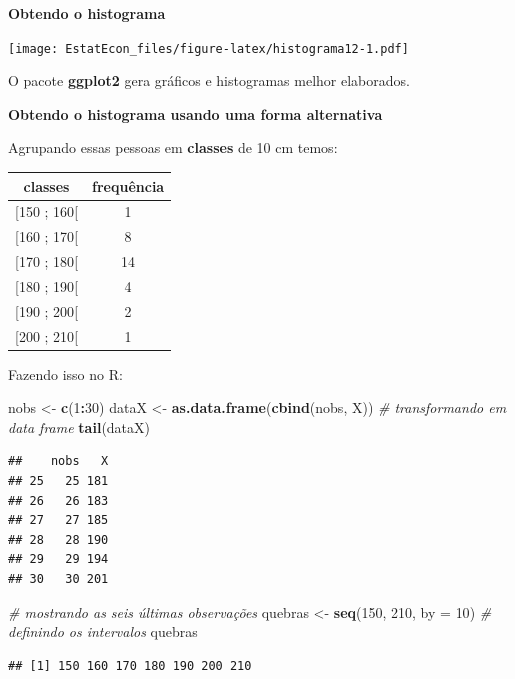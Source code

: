 \documentclass[
]{book}
\newenvironment{Shaded}{\begin{snugshade}}{\end{snugshade}}
\newcommand{\CommentTok}[1]{\textcolor[rgb]{0.56,0.35,0.01}{\textit{#1}}}
\newcommand{\DataTypeTok}[1]{\textcolor[rgb]{0.13,0.29,0.53}{#1}}
\newcommand{\DecValTok}[1]{\textcolor[rgb]{0.00,0.00,0.81}{#1}}
\newcommand{\KeywordTok}[1]{\textcolor[rgb]{0.13,0.29,0.53}{\textbf{#1}}}
\newcommand{\NormalTok}[1]{#1}
\newcommand{\OperatorTok}[1]{\textcolor[rgb]{0.81,0.36,0.00}{\textbf{#1}}}
\newcommand{\OtherTok}[1]{\textcolor[rgb]{0.56,0.35,0.01}{#1}}
\newcommand{\StringTok}[1]{\textcolor[rgb]{0.31,0.60,0.02}{#1}}
\begin{document}
\textbf{Obtendo o histograma}

\texttt{[image: EstatEcon\_files/figure-latex/histograma12-1.pdf]}

O pacote \textbf{ggplot2} gera gráficos e histogramas melhor elaborados.

\textbf{Obtendo o histograma usando uma forma alternativa}

Agrupando essas pessoas em \textbf{classes} de 10 cm temos:

\begin{longtable}[]{@{}cc@{}}
\toprule
classes & frequência\tabularnewline
\midrule
\endhead
{[}150 ; 160{[} & 1\tabularnewline
{[}160 ; 170{[} & 8\tabularnewline
{[}170 ; 180{[} & 14\tabularnewline
{[}180 ; 190{[} & 4\tabularnewline
{[}190 ; 200{[} & 2\tabularnewline
{[}200 ; 210{[} & 1\tabularnewline
\bottomrule
\end{longtable}

Fazendo isso no R:

\begin{Shaded}
\begin{Highlighting}[]
\NormalTok{nobs <-}\StringTok{ }\KeywordTok{c}\NormalTok{(}\DecValTok{1}\OperatorTok{:}\DecValTok{30}\NormalTok{)}
\NormalTok{dataX <-}\StringTok{ }\KeywordTok{as.data.frame}\NormalTok{(}\KeywordTok{cbind}\NormalTok{(nobs, X))}
\CommentTok{# transformando em data frame}
\KeywordTok{tail}\NormalTok{(dataX)}
\end{Highlighting}
\end{Shaded}

\begin{verbatim}
##    nobs   X
## 25   25 181
## 26   26 183
## 27   27 185
## 28   28 190
## 29   29 194
## 30   30 201
\end{verbatim}

\begin{Shaded}
\begin{Highlighting}[]
\CommentTok{# mostrando as seis últimas observações}
\NormalTok{quebras <-}\StringTok{ }\KeywordTok{seq}\NormalTok{(}\DecValTok{150}\NormalTok{, }\DecValTok{210}\NormalTok{, }\DataTypeTok{by =} \DecValTok{10}\NormalTok{)}
\CommentTok{# definindo os intervalos}
\NormalTok{quebras}
\end{Highlighting}
\end{Shaded}

\begin{verbatim}
## [1] 150 160 170 180 190 200 210
\end{verbatim}

\begin{Shaded}
\end{Shaded}
\end{document}
